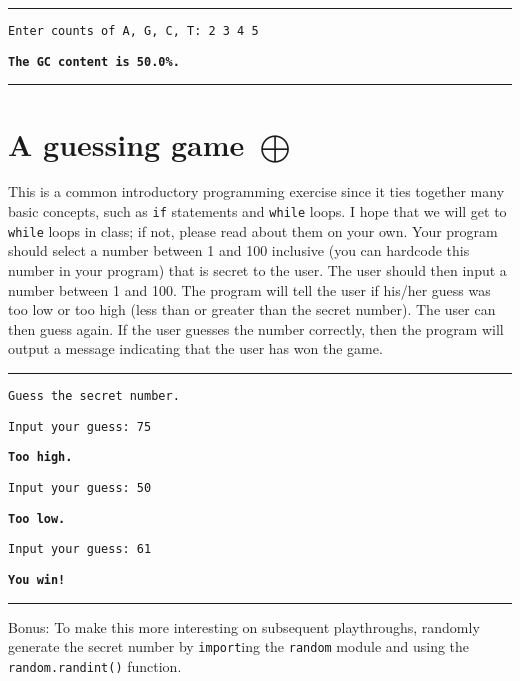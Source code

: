 \documentclass[12pt, letterpaper]{article}
\begin{document}
\vspace{2mm}\hrule\vspace{2mm}

\texttt{Enter counts of A, G, C, T: 2 3 4 5}

\texttt{\bfseries The GC content is 50.0\%.}

\vspace{2mm}\hrule\vspace{2mm}

\section{\upshape A guessing game $\bigoplus$}
This is a common introductory programming exercise since it ties together many basic concepts, such as \texttt{if} statements and \texttt{while} loops. I hope that we will get to \texttt{while} loops in class; if not, please read about them on your own.
Your program should select a number between 1 and 100 inclusive (you can hardcode this number in your program) that is secret to the user. The user should then input a number between 1 and 100. The program will tell the user if his/her guess was too low or too high (less than or greater than the secret number). The user can then guess again. If the user guesses the number correctly, then the program will output a message indicating that the user has won the game.

\vspace{2mm}\hrule\vspace{2mm}

\texttt{Guess the secret number.}

\texttt{Input your guess: 75}

\texttt{\bfseries Too high.}

\texttt{Input your guess: 50}

\texttt{\bfseries Too low.}

\texttt{Input your guess: 61}

\texttt{\bfseries You win!}

\vspace{2mm}\hrule\vspace{2mm}

Bonus: To make this more interesting on subsequent playthroughs, randomly generate the secret number by \texttt{import}ing the \texttt{random} module and using the \texttt{random.randint()} function.
\end{document}
